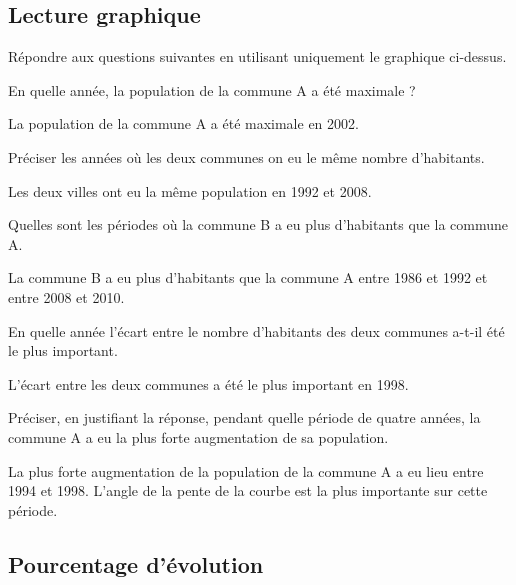 \documentclass[a4paper,11pt]{exam}
\begin{document}
\subsection{Lecture graphique}				

Répondre aux questions suivantes en utilisant uniquement le graphique ci-dessus.

\begin{questions}
	\question En quelle année, la population de la commune A a été maximale ?
	\begin{solution}
		La population de la commune A a été maximale en 2002.
	\end{solution}
	
	\question Préciser les années où les deux communes on eu le même nombre d'habitants.
	\begin{solution}
		Les deux villes ont eu la même population en 1992 et 2008.
	\end{solution}
	
	\question Quelles sont les périodes où la commune B a eu plus d'habitants que la commune A.
	\begin{solution}
		La commune B a eu plus d'habitants que la commune A entre 1986 et 1992 et entre 2008 et 2010.
	\end{solution}
	
	\question En quelle année l'écart entre le nombre d'habitants des deux communes a-t-il été le plus important.
	\begin{solution}
		L'écart entre les deux communes a été le plus important en 1998.
	\end{solution}
	
	\question Préciser, en justifiant la réponse, pendant quelle période de quatre années, la commune A a eu la plus forte augmentation de sa population.
	\begin{solution}
		La plus forte augmentation de la population de la commune A a eu lieu entre 1994 et 1998. L'angle de la pente de la courbe est la plus importante sur cette période.
	\end{solution}
\end{questions}

\subsection{Pourcentage d'évolution}
\end{document}
